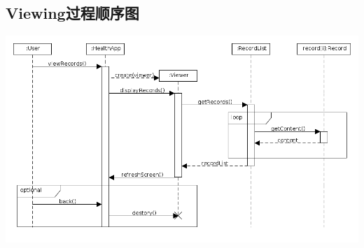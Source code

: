 \documentclass [a4paper,11pt]{article}
\begin{document}
\subsection*{Viewing过程顺序图}
\includegraphics[width=\textwidth]{../SequenceDiagram_Viewing.png}

  
\end{document}

